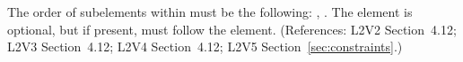 The order of subelements within \Constraint must be the following:
, .  The  element is optional,
but if present, must follow the  element.  (References: L2V2
Section~4.12; L2V3 Section~4.12; L2V4 Section~4.12; L2V5 Section~\ref{sec:constraints}.)
